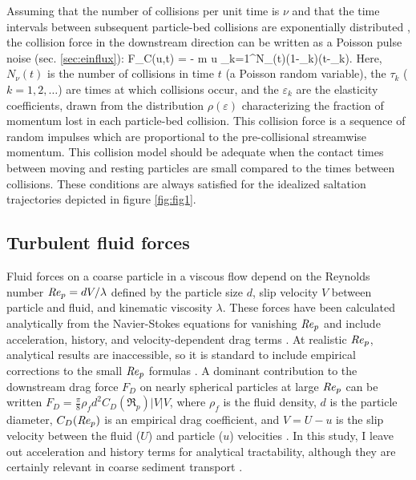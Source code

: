 Assuming that the number of collisions per unit time is $\nu$ and that the time intervals between subsequent particle-bed collisions are exponentially distributed \citep{Gordon1972}, the collision force in the downstream direction can be written as a Poisson pulse noise (sec. \ref{sec:einflux}):
\be F_C(u,t) = - m u \sum_{k=1}^{N_\nu(t)}(1-\varepsilon_k)\delta(t-\tau_k). \label{eq:col} \ee
Here, $N_\nu(t)$ is the number of collisions in time $t$ (a Poisson random variable), the $\tau_k$ ($k=1,2,\dots$) are times at which collisions occur, and the $\varepsilon_k$ are the elasticity coefficients, drawn from the distribution $\rho(\varepsilon)$ characterizing the fraction of momentum lost in each particle-bed collision.
This collision force is a sequence of random impulses which are proportional to the pre-collisional streamwise momentum. This collision model should be adequate when the contact times between moving and resting particles are small compared to the times between collisions. These conditions are always satisfied for the idealized saltation trajectories depicted in figure \ref{fig:fig1}.

\subsection{Turbulent fluid forces}
Fluid forces on a coarse particle in a viscous flow depend on the Reynolds number $\mbox{\textit{Re}}_p = d V/\lambda$ defined by the particle size $d$, slip velocity $V$ between particle and fluid, and kinematic viscosity $\lambda$.
These forces have been calculated analytically from the Navier-Stokes equations for vanishing $\mbox{\textit{Re}}_p$ and include acceleration, history, and velocity-dependent drag terms \citep{Hjelmfelt1966, Maxey1983, Auton1987}.
At realistic $\mbox{\textit{Re}}_p$, analytical results are inaccessible, so it is standard to include empirical corrections to the small $\mbox{\textit{Re}}_p$ formulas \citep{Schmeeckle2007,Clift1978}.
A dominant contribution to the downstream drag force $F_D$ on nearly spherical particles at large $\mbox{\textit{Re}}_p$ can be written $F_D = \frac{\pi}{8}
\rho_f d^2 C_D(\Re_p) |V|V$, where $\rho_f$ is the fluid density, $d$ is the particle diameter, $C_D(\mbox{\textit{Re}}_p)$ is an empirical drag coefficient, and $V = U-u$ is the slip velocity between the fluid ($U$) and particle ($u$) velocities \citep{Coleman1967, Schmeeckle2007, Dwivedi2012}.
In this study, I leave out acceleration and history terms for analytical tractability, although they are certainly relevant in coarse sediment transport \citep{Michaelides1997,Armenio2001}.

